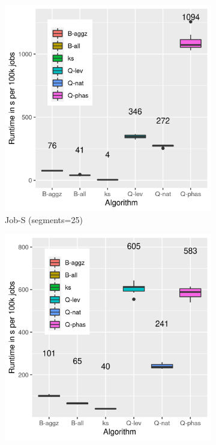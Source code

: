\documentclass{jhps}
\begin{document}
\begin{figure}
\centering
  \begin{subfigure}{0.31\textwidth}
  \centering
  \includegraphics[width=\textwidth]{progress_4296426-out-boxplot}
  \caption{Job-S (segments=25)}\label{fig:perf-job-S}
  \end{subfigure}
  \begin{subfigure}{0.31\textwidth}
  \centering
  \includegraphics[width=\textwidth]{progress_5024292-out-boxplot}

\end{subfigure}
\end{figure}
\end{document}
